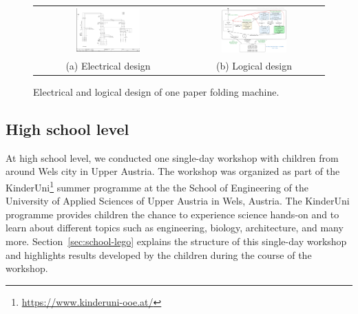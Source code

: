 \documentclass{PDS}
\begin{document}
\begin{figure}[htbp]
    \begin{center}
        \begin{tabular}{cc}
            \includegraphics[width=0.45\textwidth]{./figures/paper_electric.png} &
            \includegraphics[width=0.49\textwidth]{./figures/paper_control.png} \\
            (a) Electrical design &
            (b) Logical design
        \end{tabular}
    \end{center}
    \caption{Electrical and logical design of one paper folding machine.}
    \label{fig:paper-sub}
\end{figure}

\subsection{High school level}
\label{sec:school}

At high school level, we conducted one single-day workshop with children from around Wels city in Upper Austria.
The workshop was organized as part of the KinderUni\footnote{\url{https://www.kinderuni-ooe.at/}} summer programme at the the School of Engineering of the University of Applied Sciences of Upper Austria in Wels, Austria.
The KinderUni programme provides children the chance to experience science hands-on and to learn about different topics such as engineering, biology, architecture, and many more.
Section~\ref{sec:school-lego} explains the structure of this single-day workshop and highlights results developed by the children during the course of the workshop.
\end{document}
